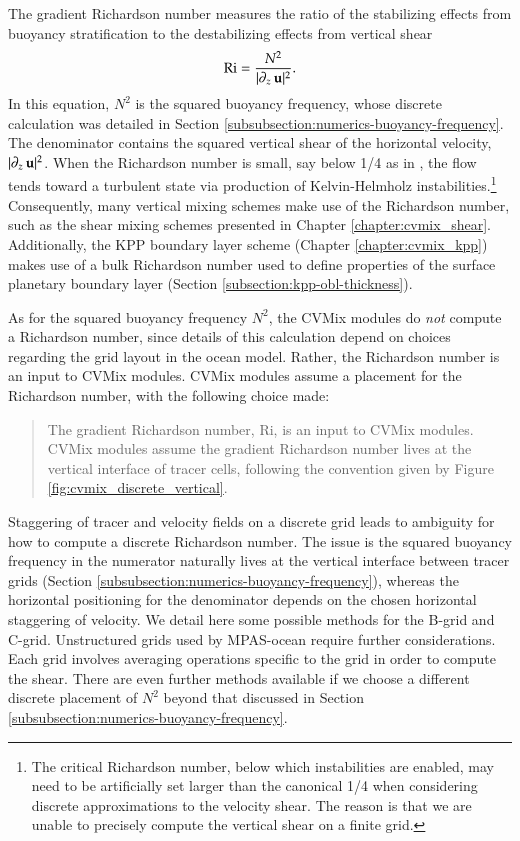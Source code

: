 The gradient Richardson number measures the ratio of the stabilizing
effects from buoyancy stratification to the destabilizing effects from
vertical shear
\begin{equation}
  \mbox{Ri}= \frac{N^{2} }{ |\partial_{z} \, {\bf u}|^{2} }.
\label{eq:flux-Richardson-elements}
\end{equation}
In this equation, $N^{2}$ is the squared buoyancy frequency, whose
discrete calculation was detailed in Section
\ref{subsubsection:numerics-buoyancy-frequency}.  The denominator
contains the squared vertical shear of the horizontal velocity,
$|\partial_{z} \, {\bf u}|^{2}$.  When the Richardson number is small,
say below 1/4 as in \cite{miles1961}, the flow tends toward a
turbulent state via production of Kelvin-Helmholz
instabilities.\footnote{The critical Richardson number, below which
  instabilities are enabled, may need to be artificially set larger
  than the canonical 1/4 when considering discrete approximations to
  the velocity shear.  The reason is that we are unable to precisely
  compute the vertical shear on a finite grid.}  Consequently, many
vertical mixing schemes make use of the Richardson number, such as the
shear mixing schemes presented in Chapter \ref{chapter:cvmix_shear}.
Additionally, the KPP boundary layer scheme (Chapter
\ref{chapter:cvmix_kpp}) makes use of a bulk Richardson number used to
define properties of the surface planetary boundary layer (Section
\ref{subsection:kpp-obl-thickness}).

As for the squared buoyancy frequency $N^{2}$, the CVMix modules do
{\it not} compute a Richardson number, since details of this
calculation depend on choices regarding the grid layout in the ocean
model.  Rather, the Richardson number is an input to CVMix modules.
CVMix modules assume a placement for the Richardson number, with the
following choice made:
\begin{mdframed}[backgroundcolor=lightgray!50]
\begin{quote}
  {\sf The gradient Richardson number, $\mbox{Ri}$, is an input to
    CVMix modules.  CVMix modules assume the gradient Richardson
    number lives at the vertical interface of tracer cells, following
    the convention given by Figure
    \ref{fig:cvmix_discrete_vertical}.}
\end{quote}
\end{mdframed}

Staggering of tracer and velocity fields on a discrete grid leads to
ambiguity for how to compute a discrete Richardson number.  The issue
is the squared buoyancy frequency in the numerator naturally lives at
the vertical interface between tracer grids (Section
\ref{subsubsection:numerics-buoyancy-frequency}), whereas the
horizontal positioning for the denominator depends on the chosen
horizontal staggering of velocity.  We detail here some possible
methods for the B-grid and C-grid.  Unstructured grids used by
MPAS-ocean require further considerations.  Each grid involves
averaging operations specific to the grid in order to compute the
shear.  There are even further methods available if we choose a
different discrete placement of $N^{2}$ beyond that discussed in
Section \ref{subsubsection:numerics-buoyancy-frequency}.


